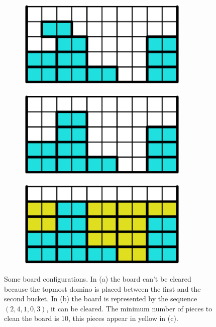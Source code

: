 \begin{figure}[ht]
  \centering
  \begin{subfigure}[b]{0.2\textwidth}
    \centering
    \includegraphics[width=0.9\textwidth]{pictures/dominoes/horitzonatl_configuration_1.pdf}
    \caption{}
  \end{subfigure}
  \begin{subfigure}[b]{0.2\textwidth}
    \centering
    \includegraphics[width=0.9\textwidth]{pictures/dominoes/horitzonatl_configuration_2.pdf}
    \caption{}
  \end{subfigure}
  \begin{subfigure}[b]{0.2\textwidth}
    \centering
    \includegraphics[width=0.9\textwidth]{pictures/dominoes/horitzonatl_configuration_3.pdf}
    \caption{}
  \end{subfigure}
  \caption{Some board configurations. In (a) the board can't be cleared because the topmost domino is placed between the first and the second bucket. In (b) the board is represented by the sequence $(2,4,1,0,3)$, it can be cleared. The minimum number of pieces to clean the board is 10, this pieces appear in yellow in (c).}
  \label{dom:horitzonatl_configuration}
\end{figure}

